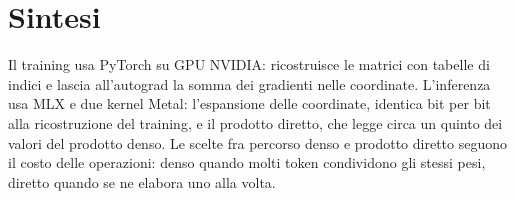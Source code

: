 \section{Sintesi}

Il training usa PyTorch su GPU NVIDIA: ricostruisce le matrici con tabelle di indici e lascia all'autograd la somma dei gradienti nelle coordinate. L'inferenza usa MLX e due kernel Metal: l'espansione delle coordinate, identica bit per bit alla ricostruzione del training, e il prodotto diretto, che legge circa un quinto dei valori del prodotto denso. Le scelte fra percorso denso e prodotto diretto seguono il costo delle operazioni: denso quando molti token condividono gli stessi pesi, diretto quando se ne elabora uno alla volta.
